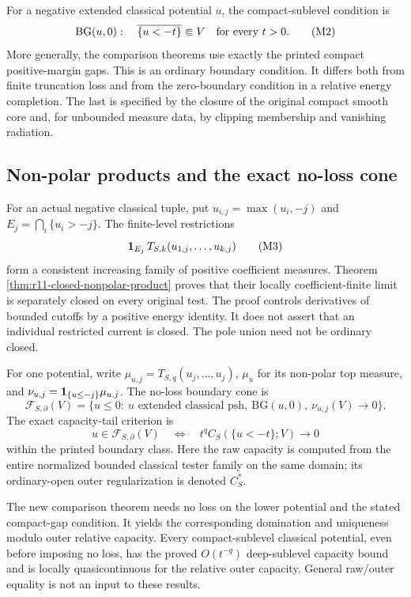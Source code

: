 \documentclass[11pt,a4paper]{article}
\numberwithin{equation}{section}
\theoremstyle{definition}
\theoremstyle{remark}
\begin{document}
For a negative extended classical potential $u$,
the compact-sublevel condition is
\[
 \mathrm{BG}(u,0):
       \quad\overline{\{u<-t\}}\Subset V
                              \quad\hbox{for every }t>0.
 \tag{M2}
\]
More generally, the comparison theorems use exactly
the printed compact positive-margin gaps.
This is an ordinary boundary condition.
It differs both from finite truncation loss and from
the zero-boundary condition in a relative energy
completion.  The last is specified by the closure
of the original compact smooth core and, for
unbounded measure data, by clipping membership and
vanishing radiation.

\subsection{Non-polar products and the exact no-loss cone}

For an actual negative classical tuple, put
$u_{i,j}=\max(u_i,-j)$ and
$E_j=\bigcap_i\{u_i>-j\}$.
The finite-level restrictions
\[
 {\bf1}_{E_j}\,
       T_{S,k}(u_{1,j},\ldots,u_{k,j})
 \tag{M3}
\]
form a consistent increasing family of positive
coefficient measures.  Theorem
\ref{thm:r11-closed-nonpolar-product}
proves that their locally coefficient-finite limit
is separately closed on every original test.
The proof controls derivatives of bounded cutoffs
by a positive energy identity.  It does not assert
that an individual restricted current is closed.
The pole union need not be ordinary closed.

For one potential, write
$\mu_{u,j}=T_{S,q}(u_j,\ldots,u_j)$,
$\mu_u$ for its non-polar top measure, and
$\nu_{u,j}={\bf1}_{\{u\leq-j\}}\mu_{u,j}$.
The no-loss boundary cone is
\[
 \mathcal F_{S,\partial}(V)
   =\{u\leq0:\ u\text{ extended classical psh},
       \ \mathrm{BG}(u,0),\ \nu_{u,j}(V)\longrightarrow0\}.
 \tag{M4}
\]
The exact capacity-tail criterion is
\[
 u\in\mathcal F_{S,\partial}(V)
 \quad\Longleftrightarrow\quad
       t^q C_S(\{u<-t\};V)\longrightarrow0
 \tag{M5}
\]
within the printed boundary class.
Here the raw capacity is computed from the entire
normalized bounded classical tester family on the
same domain; its ordinary-open outer regularization
is denoted $C_S^*$.

The new comparison theorem needs no loss on the lower
potential and the stated compact-gap condition.
It yields the corresponding domination and uniqueness
modulo outer relative capacity.
Every compact-sublevel classical potential, even
before imposing no loss, has the proved
$O(t^{-q})$ deep-sublevel capacity bound and is
locally quasicontinuous for the relative outer
capacity.  General raw/outer equality is not
an input to these results.
\end{document}
